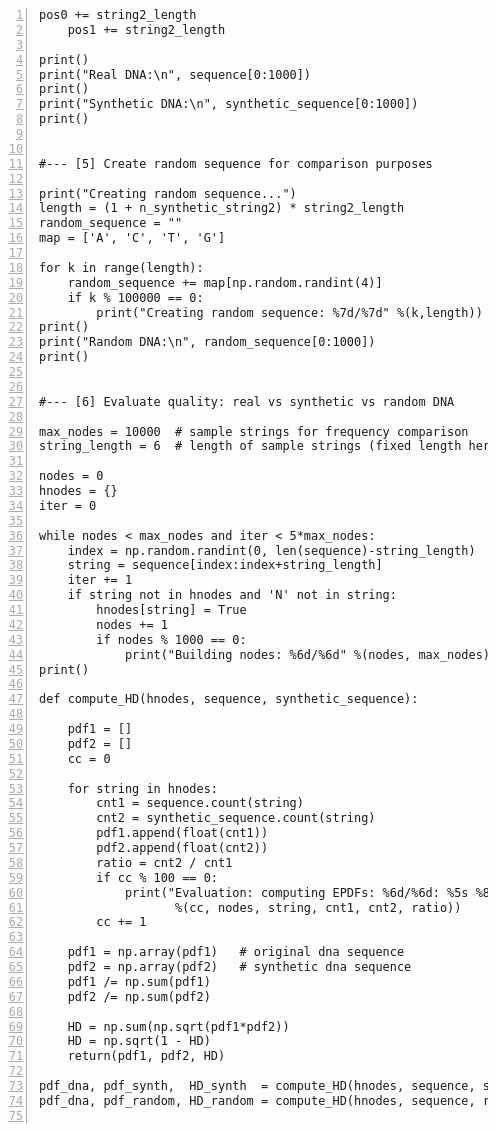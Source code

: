 \documentclass[oneside,10pt]{book}
\begin{document}
\begin{lstlisting}[numbers=left]
    pos0 += string2_length
    pos1 += string2_length

print()
print("Real DNA:\n", sequence[0:1000])
print()
print("Synthetic DNA:\n", synthetic_sequence[0:1000])
print()


#--- [5] Create random sequence for comparison purposes

print("Creating random sequence...")
length = (1 + n_synthetic_string2) * string2_length
random_sequence = ""
map = ['A', 'C', 'T', 'G']

for k in range(length):
    random_sequence += map[np.random.randint(4)]
    if k % 100000 == 0:
        print("Creating random sequence: %7d/%7d" %(k,length))
print()
print("Random DNA:\n", random_sequence[0:1000])
print()


#--- [6] Evaluate quality: real vs synthetic vs random DNA

max_nodes = 10000  # sample strings for frequency comparison
string_length = 6  # length of sample strings (fixed length here)

nodes = 0
hnodes = {}
iter = 0

while nodes < max_nodes and iter < 5*max_nodes:
    index = np.random.randint(0, len(sequence)-string_length)
    string = sequence[index:index+string_length]
    iter += 1
    if string not in hnodes and 'N' not in string:
        hnodes[string] = True
        nodes += 1
        if nodes % 1000 == 0:
            print("Building nodes: %6d/%6d" %(nodes, max_nodes))
print()

def compute_HD(hnodes, sequence, synthetic_sequence):

    pdf1 = []
    pdf2 = []
    cc = 0

    for string in hnodes:
        cnt1 = sequence.count(string) 
        cnt2 = synthetic_sequence.count(string) 
        pdf1.append(float(cnt1))
        pdf2.append(float(cnt2))
        ratio = cnt2 / cnt1
        if cc % 100 == 0:
            print("Evaluation: computing EPDFs: %6d/%6d: %5s %8d %8d %10.7f" 
                   %(cc, nodes, string, cnt1, cnt2, ratio))
        cc += 1

    pdf1 = np.array(pdf1)   # original dna sequence
    pdf2 = np.array(pdf2)   # synthetic dna sequence
    pdf1 /= np.sum(pdf1)
    pdf2 /= np.sum(pdf2)

    HD = np.sum(np.sqrt(pdf1*pdf2))
    HD = np.sqrt(1 - HD)
    return(pdf1, pdf2, HD) 

pdf_dna, pdf_synth,  HD_synth  = compute_HD(hnodes, sequence, synthetic_sequence)
pdf_dna, pdf_random, HD_random = compute_HD(hnodes, sequence, random_sequence)


\end{lstlisting}
\end{document}
